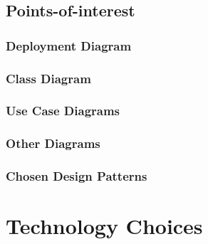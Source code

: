\documentclass{article}
\begin{document}
    \subsection{Points-of-interest}
        \subsubsection{Deployment Diagram}
        \subsubsection{Class Diagram}
        \subsubsection{Use Case Diagrams}
        \subsubsection{Other Diagrams}
        \subsubsection{Chosen Design Patterns}
\section{Technology Choices}
\end{document}
